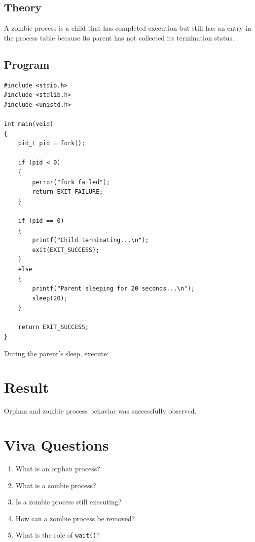 \documentclass[12pt,a4paper]{report}
\newcommand{\terminal}[1]{
\begin{center}
\fbox{\parbox{0.88\textwidth}{\ttfamily #1}}
\end{center}
}
\begin{document}
\subsection*{Theory}

A zombie process is a child that has completed execution but still has an entry
in the process table because its parent has not collected its termination
status.

\subsection*{Program}

\begin{lstlisting}
#include <stdio.h>
#include <stdlib.h>
#include <unistd.h>

int main(void)
{
    pid_t pid = fork();

    if (pid < 0)
    {
        perror("fork failed");
        return EXIT_FAILURE;
    }

    if (pid == 0)
    {
        printf("Child terminating...\n");
        exit(EXIT_SUCCESS);
    }
    else
    {
        printf("Parent sleeping for 20 seconds...\n");
        sleep(20);
    }

    return EXIT_SUCCESS;
}
\end{lstlisting}

During the parent's sleep, execute:

\terminal{ps -el | grep Z}

\section*{Result}

Orphan and zombie process behavior was successfully observed.

\section*{Viva Questions}

\begin{enumerate}
    \item What is an orphan process?
    \item What is a zombie process?
    \item Is a zombie process still executing?
    \item How can a zombie process be removed?
    \item What is the role of \texttt{wait()}?
\end{enumerate}
\end{document}
